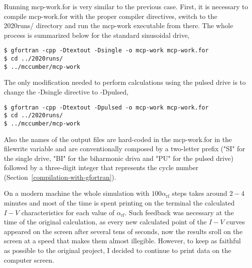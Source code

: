 Running \textsf{mcp-work.for} is very similar to the previous case. First, it is necessary to compile \textsf{mcp-work.for} with the proper compiler directives, switch to the \textsf{2020runs/} directory and run the \textsf{mcp-work} executable from there. The whole process is summarized below for the standard sinusoidal drive,

\begin{lstlisting}
$ gfortran -cpp -Dtextout -Dsingle -o mcp-work mcp-work.for
$ cd ../2020runs/
$ ../mccumber/mcp-work
\end{lstlisting}

The only modification needed to perform calculations using the pulsed drive is to change the \textsf{-Dsingle} directive to \textsf{-Dpulsed},

\begin{lstlisting}
$ gfortran -cpp -Dtextout -Dpulsed -o mcp-work mcp-work.for
$ cd ../2020runs/
$ ../mccumber/mcp-work
\end{lstlisting}


Also the names of the output files are hard-coded in the \textsf{mcp-work.for} in the \textsf{filewrite} variable and are conventionally composed by a two-letter prefix ("SI" for the single drive, "BI" for the biharmonic driva and "PU" for the pulsed drive) followed by a three-digit integer that represents the cycle number (Section~\ref{compilation-with-gfortran}).

On a modern machine the whole simulation with $100 \alpha_\mathrm{rf}$ steps takes around $2 - 4$ minutes and most of the time is spent printing on the terminal the calculated $I - V$ characteristics for each value of $\alpha_\mathrm{rf}$. Such feedback was necessary at the time of the original calculation, as every new calculated point of the $I - V$ curves appeared on the screen after several tens of seconds, now the results sroll on the screen at a speed that makes them almost illegible.
However, to keep as faithful as possible to the original project, I decided to continue to print data on the computer screen.

